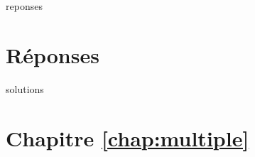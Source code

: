 \documentclass[letterpaper,10pt]{memoir}\usepackage[]{graphicx}\usepackage[]{color}
\begin{document}
\begin{Filesave}{reponses}
\bigskip
\section*{Réponses}

\end{Filesave}

\begin{Filesave}{solutions}
\section*{Chapitre \ref{chap:multiple}}

\end{Filesave}
\end{document}
